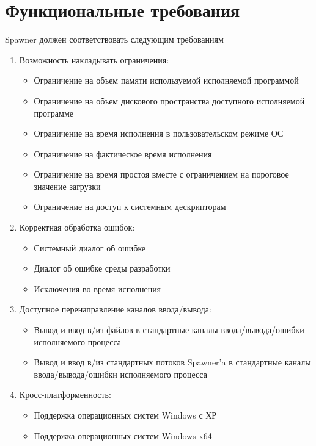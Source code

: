 \documentclass{imcs}
\begin{document}
\pagebreak



\section{Функциональные требования}
Spawner должен соответствовать следующим требованиям
\begin{enumerate}
    \item Возможность накладывать ограничения:
        \begin{itemize}
            \item Ограничение на объем памяти используемой исполняемой программой
            \item Ограничение на объем дискового пространства доступного исполняемой программе
            \item Ограничение на время исполнения в пользовательском режиме ОС
            \item Ограничение на фактическое время исполнения
            \item Ограничение на время простоя вместе с ограничением на пороговое значение загрузки
            \item Ограничение на доступ к системным дескрипторам
        \end{itemize}
    \item Корректная обработка ошибок:
        \begin{itemize}
            \item Системный диалог об ошибке
            \item Диалог об ошибке среды разработки
            \item Исключения во время исполнения
        \end{itemize}
    \item Доступное перенаправление каналов ввода/вывода:
        \begin{itemize}
            \item Вывод и ввод в/из файлов в стандартные каналы ввода/вывода/ошибки исполняемого процесса
            \item Вывод и ввод в/из стандартных потоков Spawner'a в стандартные каналы ввода/вывода/ошибки исполняемого процесса
        \end{itemize}
    \item Кросс-платформенность:
        \begin{itemize}
            \item Поддержка операционных систем Windows с ХР
            \item Поддержка операционных систем Windows x64

\end{itemize}
\end{enumerate}
\end{document}
